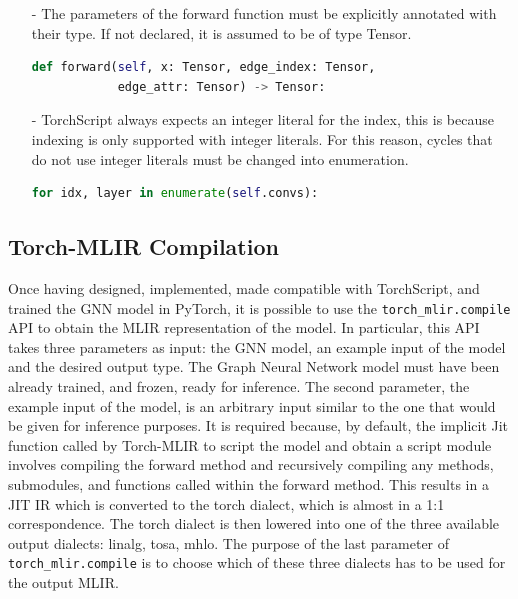 \begin{itemize}
\begin{lstlisting}[language=Python,label={lst:splitted-forward}]
\end{lstlisting}
    \item[-] The parameters of the forward function must be explicitly annotated with their type.
    If not declared, it is assumed to be of type Tensor.
\begin{lstlisting}[language=Python,label={lst:forward-annotation}]
def forward(self, x: Tensor, edge_index: Tensor,
            edge_attr: Tensor) -> Tensor:
\end{lstlisting}
    \item[-] TorchScript always expects an integer literal for the index, this is because indexing is only supported with integer literals.
    For this reason, cycles that do not use integer literals must be changed into enumeration.
\begin{lstlisting}[language=Python,label={lst:enumeration}]
for idx, layer in enumerate(self.convs):
\end{lstlisting}
\end{itemize}

\subsection{Torch-MLIR Compilation}
\label{subsec:torch-mlir-compilation}%

Once having designed, implemented, made compatible with TorchScript, and trained the GNN model in PyTorch, it is possible to use the \lstinline{torch_mlir.compile} API to obtain the MLIR representation of the model.
In particular, this API takes three parameters as input: the GNN model, an example input of the model and the desired output type.
The Graph Neural Network model must have been already trained, and frozen, ready for inference.
The second parameter, the example input of the model, is an arbitrary input similar to the one that would be given for inference purposes.
It is required because, by default, the implicit Jit function called by Torch-MLIR to script the model and obtain a script module involves compiling the forward method and recursively compiling any methods, submodules, and functions called within the forward method.
This results in a JIT IR which is converted to the torch dialect, which is almost in a 1:1 correspondence.
The torch dialect is then lowered into one of the three available output dialects: linalg, tosa, mhlo.
The purpose of the last parameter of \lstinline{torch_mlir.compile} is to choose which of these three dialects has to be used for the output MLIR\@.

